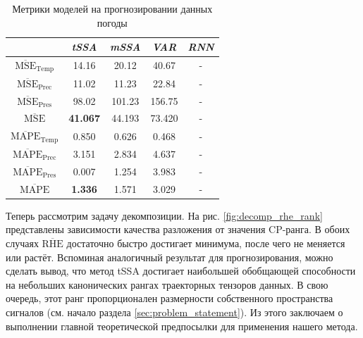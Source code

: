 			\def\arraystretch{1.1}
			\begin{table}[h]
				\centering
				\caption{Метрики моделей на прогнозировании данных погоды}\label{tab:pred_res_weather}
				\begin{tabular}{|c|c|c|c|c|}
					\hline
					& \textit{tSSA}                & \textit{mSSA} & \textit{VAR} & \textit{RNN} \\ \hline
					$ \overline{\text{MSE}}_{\text{Temp}} $  & 14.16                        & 20.12         & 40.67        & -            \\ \hline
					$ \overline{\text{MSE}}_{\text{Prec}} $  & 11.02                        & 11.23         & 22.84        & -            \\ \hline
					$ \overline{\text{MSE}}_{\text{Pres}} $  & 98.02                        & 101.23        & 156.75       & -            \\ \hline
					$ \overline{\text{MSE}} $        & \textbf{41.067}              & 44.193        & 73.420       & -            \\ \hline
					$ \overline{\text{MAPE}}_{\text{Temp}} $ & 0.850 & 0.626         & 0.468        & -            \\ \hline
					$ \overline{\text{MAPE}}_{\text{Prec}} $ & 3.151 & 2.834         & 4.637        & -            \\ \hline
					$ \overline{\text{MAPE}}_{\text{Pres}} $ & 0.007 & 1.254         & 3.983        & -            \\ \hline
					$ \overline{\text{MAPE}} $       & \textbf{1.336}               & 1.571         & 3.029        & -            \\ \hline
				\end{tabular}
			\end{table}
			
			Теперь рассмотрим задачу декомпозиции. На рис. \ref{fig:decomp_rhe_rank} представлены зависимости качества разложения от значения CP-ранга. В обоих случаях $ \overline{\text{RHE}} $ достаточно быстро достигает минимума, после чего не меняется или растёт. Вспоминая аналогичный результат для прогнозирования, можно сделать вывод, что метод tSSA достигает наибольшей обобщающей способности на небольших канонических рангах траекторных тензоров данных. В свою очередь, этот ранг пропорционален размерности собственного пространства сигналов (см. начало раздела \ref{sec:problem_statement}). Из этого заключаем о выполнении главной теоретической предпосылки для применения нашего метода.
			
